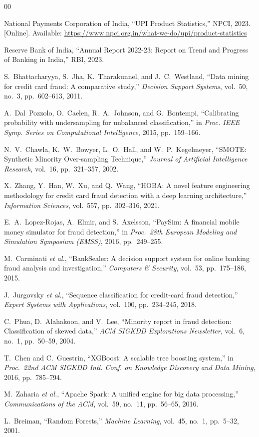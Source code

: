 \documentclass[conference]{IEEEtran}
\begin{document}
\begin{thebibliography}{00}

National Payments Corporation of India, ``UPI Product Statistics,'' NPCI, 2023. [Online]. Available: \url{https://www.npci.org.in/what-we-do/upi/product-statistics}

Reserve Bank of India, ``Annual Report 2022-23: Report on Trend and Progress of Banking in India,'' RBI, 2023.

S.~Bhattacharyya, S.~Jha, K.~Tharakunnel, and J.~C.~Westland, ``Data mining for credit card fraud: A comparative study,'' \emph{Decision Support Systems}, vol.~50, no.~3, pp.~602--613, 2011.

A.~Dal~Pozzolo, O.~Caelen, R.~A.~Johnson, and G.~Bontempi, ``Calibrating probability with undersampling for unbalanced classification,'' in \emph{Proc. IEEE Symp. Series on Computational Intelligence}, 2015, pp.~159--166.

N.~V.~Chawla, K.~W.~Bowyer, L.~O.~Hall, and W.~P.~Kegelmeyer, ``SMOTE: Synthetic Minority Over-sampling Technique,'' \emph{Journal of Artificial Intelligence Research}, vol.~16, pp.~321--357, 2002.

X.~Zhang, Y.~Han, W.~Xu, and Q.~Wang, ``HOBA: A novel feature engineering methodology for credit card fraud detection with a deep learning architecture,'' \emph{Information Sciences}, vol.~557, pp.~302--316, 2021.

E.~A.~Lopez-Rojas, A.~Elmir, and S.~Axelsson, ``PaySim: A financial mobile money simulator for fraud detection,'' in \emph{Proc.~28th European Modeling and Simulation Symposium (EMSS)}, 2016, pp.~249--255.

M.~Carminati \emph{et al.}, ``BankSealer: A decision support system for online banking fraud analysis and investigation,'' \emph{Computers \& Security}, vol.~53, pp.~175--186, 2015.

J.~Jurgovsky \emph{et al.}, ``Sequence classification for credit-card fraud detection,'' \emph{Expert Systems with Applications}, vol.~100, pp.~234--245, 2018.

C.~Phua, D.~Alahakoon, and V.~Lee, ``Minority report in fraud detection: Classification of skewed data,'' \emph{ACM SIGKDD Explorations Newsletter}, vol.~6, no.~1, pp.~50--59, 2004.

T.~Chen and C.~Guestrin, ``XGBoost: A scalable tree boosting system,'' in \emph{Proc.~22nd ACM SIGKDD Intl. Conf. on Knowledge Discovery and Data Mining}, 2016, pp.~785--794.

M.~Zaharia \emph{et al.}, ``Apache Spark: A unified engine for big data processing,'' \emph{Communications of the ACM}, vol.~59, no.~11, pp.~56--65, 2016.

L.~Breiman, ``Random Forests,'' \emph{Machine Learning}, vol.~45, no.~1, pp.~5--32, 2001.

\end{thebibliography}
\balance
\end{document}
